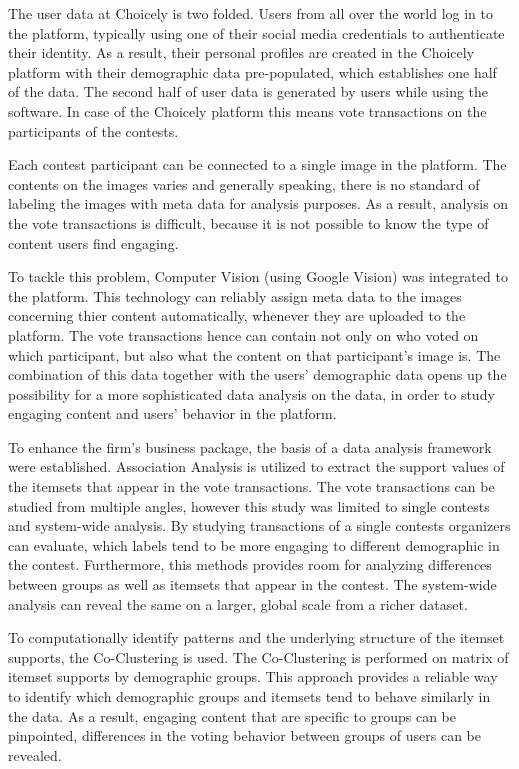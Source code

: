 The user data at Choicely is two folded. Users from all over the world log in to the platform, typically using one of their social media credentials to authenticate their identity. As a result, their personal profiles are created in the Choicely platform with their demographic data pre-populated, which establishes one half of the data. The second half of user data is generated by users while using the software. In case of the Choicely platform this means vote transactions on the participants of the contests. 

Each contest participant can be connected to a single image in the platform. The contents on the images varies and generally speaking, there is no standard of labeling the images with meta data for analysis purposes. As a result, analysis on the vote transactions is difficult, because it is not possible to know the type of content users find engaging.

To tackle this problem, Computer Vision (using Google Vision) was integrated to the platform. This technology can reliably assign meta data to the images concerning thier content automatically, whenever they are uploaded to the platform. The vote transactions hence can contain not only on who voted on which participant, but also what the content on that participant's image is. The combination of this data together with the users' demographic data opens up the possibility for a more sophisticated data analysis on the data, in order to study engaging content and users' behavior in the platform. 

To enhance the firm's business package, the basis of a data analysis framework were established. Association Analysis is utilized to extract the support values of the itemsets that appear in the vote transactions. 
The vote transactions can be studied from multiple angles, however this study was limited to single contests and system-wide analysis. By studying transactions of a single contests organizers can evaluate, which labels tend to be more engaging to different demographic in the contest. Furthermore, this methods provides room for analyzing differences between groups as well as itemsets that appear in the contest. The system-wide analysis can reveal the same on a larger, global scale from a richer dataset. 

To computationally identify patterns and the underlying structure of the itemset supports, the Co-Clustering is used. The Co-Clustering is performed on matrix of itemset supports by demographic groups. This approach provides a reliable way to identify which demographic groups and itemsets tend to behave similarly in the data. As a result, engaging content that are specific to groups can be pinpointed, differences in the voting behavior between groups of users can be revealed. 

